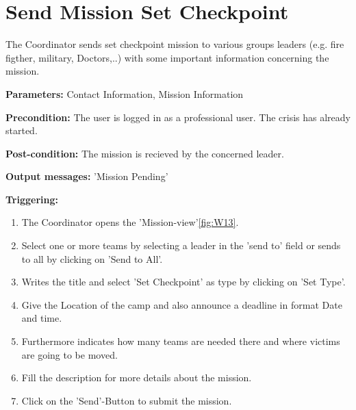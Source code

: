 \section{Send Mission Set Checkpoint}
\label{operation:Checkpoint}
The Coordinator sends set checkpoint mission to various groups leaders (e.g.
fire figther, military, Doctors,..) with some important information concerning the
mission.\\
\begin{description}
\item \textbf{Parameters:} Contact Information, Mission Information
\item \textbf{Precondition:} The user is logged in as a professional user. The
crisis has already started. 
\item \textbf{Post-condition:} The mission is recieved by the concerned leader.
\item \textbf{Output messages:} 'Mission Pending'
\item \textbf{Triggering:}
\begin{enumerate}
\item The Coordinator opens the 'Mission-view'\ref{fig:W13}.
\item Select one or more teams by selecting a leader in the 'send to' field or
sends to all by clicking on 'Send to All'.
\item Writes the title and select 'Set Checkpoint' as type by clicking on 'Set
Type'.
\item Give the Location of the camp and also announce a deadline in format Date
and time.
\item Furthermore indicates how many teams are needed there and where victims
are going to be moved.
\item Fill the description for more details about the mission.
\item Click on the 'Send'-Button to submit the mission.
\end{enumerate}
\end{description} 

